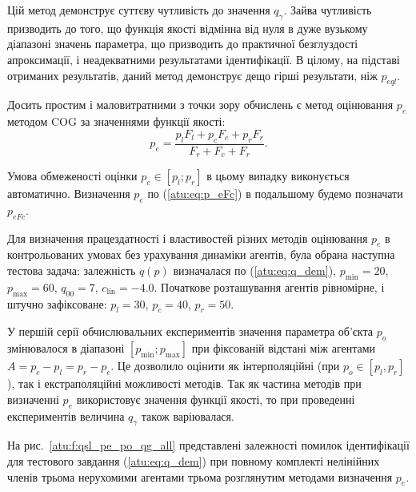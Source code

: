 \documentclass[a4paper,13pt]{atuaref}
\begin{document}
Цій метод демонструє суттєву чутливість до значення $q_\gamma$.
Зайва чутливість призводить до того, що функція якості відмінна від нуля в
дуже вузькому діапазоні значень параметра, що призводить до практичної
безглуздості апроксимації, і неадекватними результатами
ідентифікації.
В цілому, на підставі отриманих результатів, даний метод демонструє дещо
гірші результати, ніж $p_{eql}$.

Досить простим і маловитратними з точки зору обчислень є метод оцінювання $p_e$ методом
COG за значеннями функції якості:
%
\begin{equation}
  p_e =
  \frac{p_l F_l + p_c F_c + p_r F_r}{ F_r + F_c + F_r}  .
  \label{atu:eq:p_eFc}
\end{equation}

Умова обмеженості оцінки $p_e \in [p_l; p_r]$ в цьому випадку виконується
автоматично. Визначення $p_e$ по (\ref{atu:eq:p_eFc}) в подальшому будемо позначати $p_{eFc}$.

Для визначення працездатності і властивостей різних методів оцінювання $p_e$
в контрольованих умовах без урахування динаміки агентів, була обрана наступна
тестова задача: залежність $q (p)$ визначалася по (\ref{atu:eq:q_dem}),
$p_{\min}=20$, $p_{\max}=60$,
$q_{00}=7$, $c_\mathrm{lin}=-4.0$.
Початкове розташування агентів рівномірне, і штучно зафіксоване:
$p_l=30$, $p_c=40$,  $p_r=50$.

У першій серії обчислювальних експериментів значення параметра об'єкта $p_o$
змінювалося в діапазоні $[p_{\min}; p_{\max}]$ при фіксованій відстані
між агентами $A = p_c - p_l = p_r - p_c$. Це дозволило оцінити як
інтерполяційні (при $p_o \in [p_l, p_r]$), так і екстраполяційні можливості
методів. Так як частина методів при визначенні $p_e$ використовує значення
функції якості, то при проведенні експериментів величина $q_\gamma$ також
варіювалася.

На рис.~\ref{atu:f:qsl_pe_po_qg_all} представлені залежності помилок
ідентифікації для тестового завдання (\ref{atu:eq:q_dem}) при повному
комплекті нелінійних членів  трьома нерухомими
агентами трьома розглянутим методами визначення $p_e$.
\end{document}
